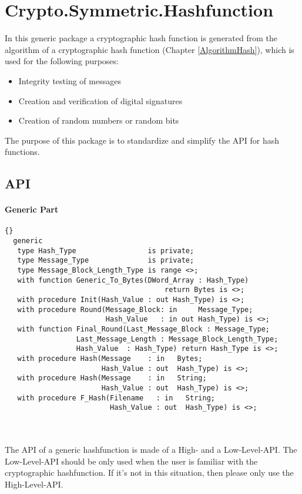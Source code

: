 \chapter{Crypto.Symmetric.Hashfunction}\label{Hash}
In this generic package a cryptographic hash function is generated from the algorithm of a cryptographic hash function (Chapter \ref{AlgorithmHash}), which is used for the following purposes:
\begin{itemize}
\item Integrity testing of messages
\item Creation and verification of digital signatures
\item Creation of random numbers or random bits
\end{itemize}
The purpose of this package is to standardize and simplify the API for hash functions. 
\section{API}
\subsubsection*{Generic Part}
\begin{lstlisting}{}
  generic
   type Hash_Type                 is private;
   type Message_Type              is private;
   type Message_Block_Length_Type is range <>;  
   with function Generic_To_Bytes(DWord_Array : Hash_Type) 
   								      return Bytes is <>;   
   with procedure Init(Hash_Value : out Hash_Type) is <>;
   with procedure Round(Message_Block: in     Message_Type;
                        Hash_Value   : in out Hash_Type) is <>;
   with function Final_Round(Last_Message_Block : Message_Type;
                 Last_Message_Length : Message_Block_Length_Type;
                 Hash_Value  : Hash_Type) return Hash_Type is <>;
   with procedure Hash(Message    : in   Bytes;
                       Hash_Value : out  Hash_Type) is <>;
   with procedure Hash(Message    : in   String;
                       Hash_Value : out  Hash_Type) is <>;
   with procedure F_Hash(Filename   : in   String;
                         Hash_Value : out  Hash_Type) is <>;
\end{lstlisting}
\\ \ \\
The API of a generic hashfunction is made of a High- and a Low-Level-API. The Low-Level-API should be only used when the user is familiar with the cryptographic hashfunction. If it's not in this situation, then please only use the High-Level-API.
